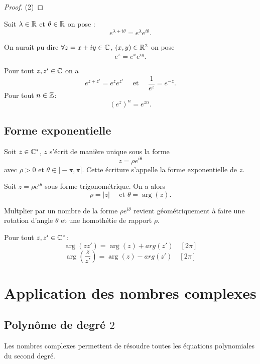 \documentclass[a4paper, 11pt]{article}
\begin{document}
\begin{proof}
(2)
\end{proof}

\begin{defi}
Soit $\lambda \in \mathbb{R}$ et $\theta \in \mathbb{R}$ on pose : 
$$e^{\lambda +i\theta} =e^{\lambda} e^{i\theta}.$$
\end{defi}
\begin{remarques}
\item On aurait pu dire $\forall z=x+iy \in \mathbb{C}$, $(x,y)\in \mathbb{R}^2$ on pose
$$e^z =e^{x}e^{iy}.$$
\end{remarques}

\begin{prop}
Pour tout $z, z'\in \mathbb{C}$ on a 
$$e^{z+z'}=e^{z}e^{z'} \quad \text{ et } \quad \frac{1}{e^z} =e^{-z}.$$
Pour tout $n\in \mathbb{Z}$:
$$\left( e^{z}\right)^n=e^{zn}.$$
\end{prop}

\subsection{Forme exponentielle}
\begin{theorem}
Soit $z\in \mathbb{C}^*$, $z$ s'écrit de manière unique sous la forme 
$$z = \rho e^{i\theta}$$
avec $\rho>0$ et $\theta \in ]-\pi, \pi]$. 
Cette écriture s'appelle la forme exponentielle de $z$. 
\end{theorem}
\begin{remarques}
\item Soit $z = \rho e^{i\theta}$ sous forme trigonométrique. On a alors 
$$\rho =|z| \quad \text{ et } \theta =\arg(z).$$
\item Multplier par un nombre de la forme $ \rho e^{i\theta}$ revient géométriquement à faire une rotation d'angle $\theta$ et une homothétie de rapport $\rho$. 
\end{remarques}

\begin{prop}
Pour tout $z,z'\in \mathbb{C}^*$:
$$\arg(zz') =\arg(z)+arg(z') \quad [2\pi]$$
$$\arg(\frac{z}{z'}) =\arg(z)-arg(z') \quad [2\pi]$$
\end{prop}





\section{Application des nombres complexes}


\subsection{Polynôme de degré $2$}
Les nombres complexes permettent de résoudre toutes les équations polynomiales du second degré. 
\end{document}

